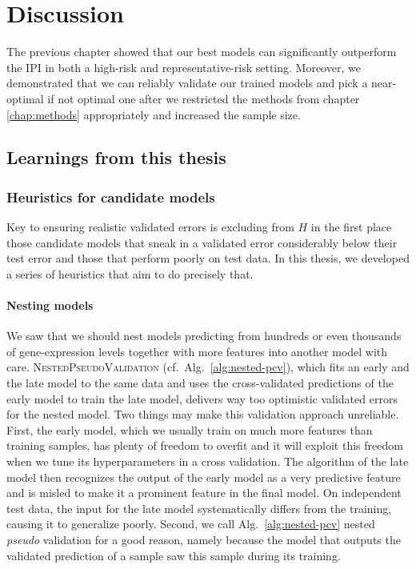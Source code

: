 \chapter{Discussion} \label{chap:discussion}

The previous chapter showed that our best models can significantly outperform the IPI in both 
a high-risk and representative-risk setting. Moreover, we demonstrated that we can reliably validate 
our trained models and pick a near-optimal if not optimal one after we restricted the methods from 
chapter \ref{chap:methods} appropriately and increased the sample size.

\section{Learnings from this thesis}\label{sec:discussion-learning}

\subsection{Heuristics for candidate models}

Key to ensuring realistic validated errors is excluding from $H$ in the first place those candidate 
models that sneak in a validated error considerably below their test error and those that perform 
poorly on test data. In this thesis, we developed a series of heuristics that aim to do precisely 
that.

\subsubsection{Nesting models}

We saw that we should nest models predicting from hundreds or even thousands of 
gene-expression levels together with more features into another model with care. 
\textsc{NestedPseudoValidation} (cf.\ Alg.\ 
\ref{alg:nested-pcv}), which fits an early and the late model to the same data and uses the 
cross-validated predictions of the early model to train the late model, delivers way too optimistic 
validated errors for the nested model. Two things may make this validation approach unreliable.
First, the early model, which we usually train
on much more features than training samples, has plenty of freedom to overfit and it will exploit this 
freedom when we tune its hyperparameters in a cross validation. The algorithm of the late model then 
recognizes the output of the early model as a very predictive feature and is misled to make it 
a prominent feature in the final model. On independent test data, the input for the late model 
systematically differs from the training, causing it to generalize poorly. Second, we call Alg.\ 
\ref{alg:nested-pcv} nested \textit{pseudo} validation for a good reason, namely because the model 
that outputs the validated prediction of a sample saw this sample during its training. 

